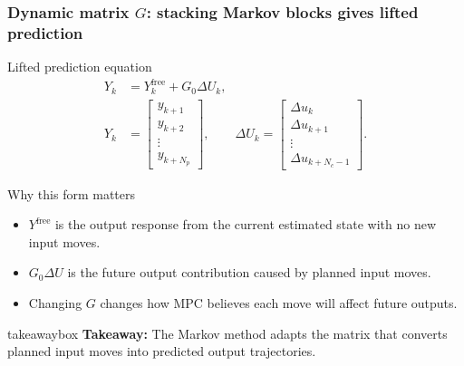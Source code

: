 \documentclass[aspectratio=169]{beamer}
\newcommand{\takeawaybox}[1]{%
\vspace{0.02cm}
\begin{center}
\begin{beamercolorbox}[wd=0.94\textwidth,sep=3pt,center,rounded=true,shadow=false]{takeawaybox}
\scriptsize
\textbf{\textcolor{maroon1}{Takeaway:}} #1
\end{beamercolorbox}
\end{center}
}
\begin{document}
\begin{frame}
\frametitle{\large \textbf{Dynamic matrix \(G\): stacking Markov blocks gives lifted prediction}}
\scriptsize

\begin{block}{Lifted prediction equation}
\begin{align*}
Y_k &= Y_k^{\mathrm{free}} + G_0 \Delta U_k,\\
Y_k &= \begin{bmatrix}y_{k+1}\\y_{k+2}\\ \vdots\\ y_{k+N_p}\end{bmatrix},
\qquad
\Delta U_k=\begin{bmatrix}\Delta u_k\\\Delta u_{k+1}\\ \vdots\\ \Delta u_{k+N_c-1}\end{bmatrix}.
\end{align*}
\end{block}

\begin{block}{Why this form matters}
\begin{itemize}\justifying
  \setlength\itemsep{0.35ex}
  \item \(Y^{\mathrm{free}}\) is the output response from the current estimated state with no new input moves.
  \item \(G_0\Delta U\) is the future output contribution caused by planned input moves.
  \item Changing \(G\) changes how MPC believes each move will affect future outputs.
\end{itemize}
\end{block}

\takeawaybox{The Markov method adapts the matrix that converts planned input moves into predicted output trajectories.}
\end{frame}
\end{document}
